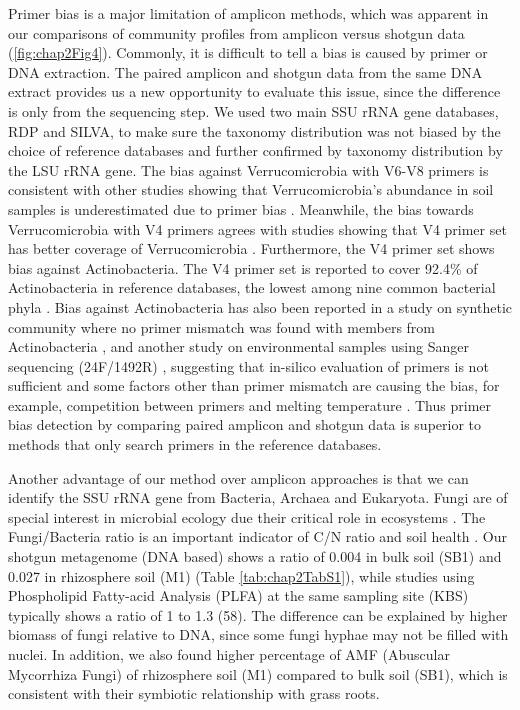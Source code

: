 \documentclass[]{msu-thesis}
\begin{document}
Primer bias is a major limitation of amplicon methods, which was apparent in our comparisons of community profiles from amplicon versus shotgun data (\cref{fig:chap2Fig4}). Commonly, it is difficult to tell a bias is caused by primer or DNA extraction. The paired amplicon and shotgun data from the same DNA extract provides us a new opportunity to evaluate this issue, since the difference is only from the sequencing step. We used two main SSU rRNA gene databases, RDP and SILVA, to make sure the taxonomy distribution was not biased by the choice of reference databases and further confirmed by taxonomy distribution by the LSU rRNA gene. The bias against Verrucomicrobia with V6-V8 primers is consistent with other studies showing that Verrucomicrobia’s abundance in soil samples is underestimated due to primer bias \cite{bergmann_under-recognized_2011}. Meanwhile, the bias towards Verrucomicrobia with V4 primers agrees with studies showing that V4 primer set has better coverage of Verrucomicrobia \cite{bergmann_under-recognized_2011}. Furthermore, the V4 primer set shows bias against Actinobacteria. The V4 primer set is reported to cover 92.4\% of Actinobacteria in reference databases, the lowest among nine common bacterial phyla \cite{bergmann_under-recognized_2011}. Bias against Actinobacteria has also been reported in a study on synthetic community where no primer mismatch was found with members from Actinobacteria \cite{shakya_comparative_2013}, and another study on environmental samples using Sanger sequencing (24F/1492R) \cite{farris_detection_2007}, suggesting that in-silico evaluation of primers is not sufficient and some factors other than primer mismatch are causing the bias, for example, competition between primers and melting temperature \cite{parada_every_2015}. Thus primer bias detection by comparing paired amplicon and shotgun data is superior to methods that only search primers in the reference databases. 

Another advantage of our method over amplicon approaches is that we can identify the SSU rRNA gene from Bacteria, Archaea and Eukaryota. Fungi are of special interest in microbial ecology due their critical role in ecosystems \cite{lindahl_fungal_2013,porras-alfaro_genus_2014}. The Fungi/Bacteria ratio is an important indicator of C/N ratio and soil health \cite{de_vries_fungal/bacterial_2006,waring_differences_2013}. Our shotgun metagenome (DNA based) shows a ratio of 0.004 in bulk soil (SB1) and 0.027 in rhizosphere soil (M1) (Table \ref{tab:chap2TabS1}), while studies using Phospholipid Fatty-acid Analysis (PLFA) at the same sampling site (KBS) typically shows a ratio of 1 to 1.3 (58). The difference can be explained by higher biomass of fungi relative to DNA, since some fungi hyphae may not be filled with nuclei. In addition, we also found higher percentage of AMF (Abuscular Mycorrhiza Fungi) of rhizosphere soil (M1) compared to bulk soil (SB1), which is consistent with their symbiotic relationship with grass roots.
\end{document}
